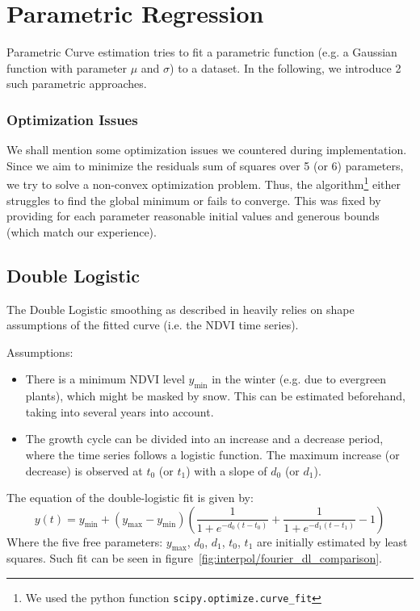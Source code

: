 \section{Parametric Regression} 
	\label{sec:itpl_parametric}
	Parametric Curve estimation tries to fit a parametric function (e.g. a Gaussian function with parameter $\mu$ and $\sigma$) to a dataset. In the following, we introduce 2 such parametric approaches.

		\subsubsection*{Optimization Issues}
			We shall mention some optimization issues we countered during implementation. Since we aim to minimize the residuals sum of squares over 5 (or 6) parameters, we try to solve a non-convex optimization problem. Thus, the algorithm\footnote{We used the python function \texttt{scipy.optimize.curve\_fit}} either struggles to find the global minimum or fails to converge. This was fixed by providing for each parameter reasonable initial values and generous bounds (which match our experience).

	\subsection{Double Logistic}
		\label{sec:double_logistic}
		The Double Logistic smoothing as described in \cite{beckImprovedMonitoringVegetation2006} heavily relies on shape assumptions of the fitted curve (i.e. the NDVI time series).

		Assumptions:
		\begin{itemize}
			\item There is a minimum NDVI level $y_{\min}$ in the winter (e.g. due to evergreen plants), which might be masked by snow. This can be estimated beforehand, taking into several years into account.
			\item The growth cycle can be divided into an increase and a decrease period, where the time series follows a logistic function. The maximum increase (or decrease) is observed at $t_0$ (or $t_1$) with a slope of $d_0$ (or $d_1$).
		\end{itemize}

		The equation of the double-logistic fit is given by:
		\begin{equation*}
			y(t) = y_{\min} + \left(y_{\max}-y_{\min}\right)\left(\frac{1}{1+e^{-d_0(t-t_0)}}+\frac{1}{1+e^{-d_1(t-t_1)}}-1\right)
		\end{equation*}
		Where the five free parameters: $y_{\max}$, $d_0$, $d_1$, $t_0$, $t_1$ are initially estimated by least squares. Such fit can be seen in figure~\ref{fig:interpol/fourier_dl_comparison}.

